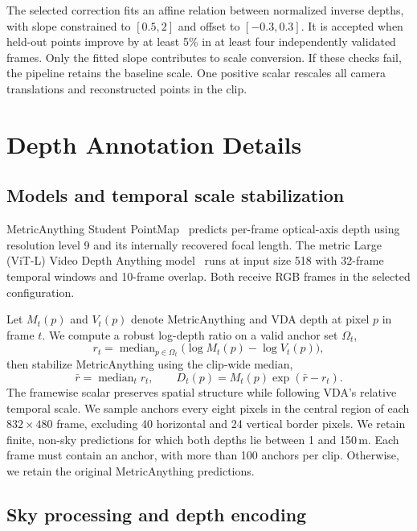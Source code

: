 The selected correction fits an affine relation between normalized inverse depths, with slope constrained to $[0.5,2]$ and offset to $[-0.3,0.3]$.
It is accepted when held-out points improve by at least 5\% in at least four independently validated frames.
Only the fitted slope contributes to scale conversion.
If these checks fail, the pipeline retains the baseline scale.
One positive scalar rescales all camera translations and reconstructed points in the clip.

\section{Depth Annotation Details}
\label{sec:supp_depth}

\subsection{Models and temporal scale stabilization}

MetricAnything Student PointMap~\cite{ma2026metricanything} predicts per-frame optical-axis depth using resolution level 9 and its internally recovered focal length.
The metric Large (ViT-L) Video Depth Anything model~\cite{chen2025videodepthanything} runs at input size 518 with 32-frame temporal windows and 10-frame overlap.
Both receive RGB frames in the selected configuration.

Let $M_t(p)$ and $V_t(p)$ denote MetricAnything and VDA depth at pixel $p$ in frame $t$.
We compute a robust log-depth ratio on a valid anchor set $\Omega_t$,
\begin{equation}
    r_t = \operatorname{median}_{p\in\Omega_t}
    \bigl(\log M_t(p)-\log V_t(p)\bigr),
\end{equation}
then stabilize MetricAnything using the clip-wide median,
\begin{equation}
    \bar r = \operatorname{median}_t r_t,
    \qquad D_t(p) = M_t(p)\exp(\bar r-r_t).
\end{equation}
The framewise scalar preserves spatial structure while following VDA's relative temporal scale.
We sample anchors every eight pixels in the central region of each $832\!\times\!480$ frame, excluding 40 horizontal and 24 vertical border pixels.
We retain finite, non-sky predictions for which both depths lie between 1 and 150\,m.
Each frame must contain an anchor, with more than 100 anchors per clip.
Otherwise, we retain the original MetricAnything predictions.

\subsection{Sky processing and depth encoding}

